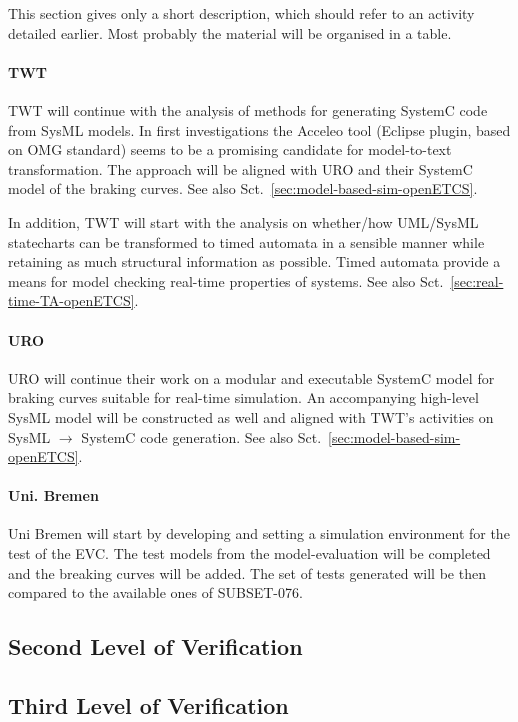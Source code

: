 This section gives only a short description, which should refer to an
activity detailed earlier. Most probably the material will be
organised in a table.

\paragraph{TWT}
TWT will continue with the analysis of methods for generating SystemC
code from SysML models. In first investigations the Acceleo tool
(Eclipse plugin, based on OMG standard) seems to be a promising
candidate for model-to-text transformation. The approach will be
aligned with URO and their SystemC model of the braking curves.  See
also Sct.~\ref{sec:model-based-sim-openETCS}.

In addition, TWT will start with the analysis on whether/how UML/SysML
statecharts can be transformed to timed automata in a sensible manner
while retaining as much structural information as possible. Timed
automata provide a means for model checking real-time properties of
systems. See also Sct.~\ref{sec:real-time-TA-openETCS}.

\paragraph{URO}
URO will continue their work on a modular and executable SystemC model
for braking curves suitable for real-time simulation. An accompanying
high-level SysML model will be constructed as well and aligned with
TWT's activities on SysML $\rightarrow$ SystemC code generation.  See
also Sct.~\ref{sec:model-based-sim-openETCS}.

\paragraph{Uni. Bremen}
Uni Bremen will start by developing and setting a simulation
environment for the test of the EVC. The test models from the
model-evaluation will be completed and the breaking curves will be
added.  The set of tests generated will be then compared to the
available ones of SUBSET-076.


\subsection{Second Level of Verification}
\label{sec:secon-level-verif}

\subsection{Third Level of Verification}
\label{sec:third-level-verif}


